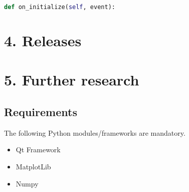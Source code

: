 \documentclass{article}
\begin{document}
\begin{lstlisting}[language=Python]
def on_initialize(self, event):
\end{lstlisting}


\section{4. Releases}


\section{5. Further research}

\subsection{Requirements}
The following Python modules/frameworks are mandatory.

\begin{itemize}
  \item Qt Framework
  \item MatplotLib
  \item Numpy
\end{itemize}





\end{document}

